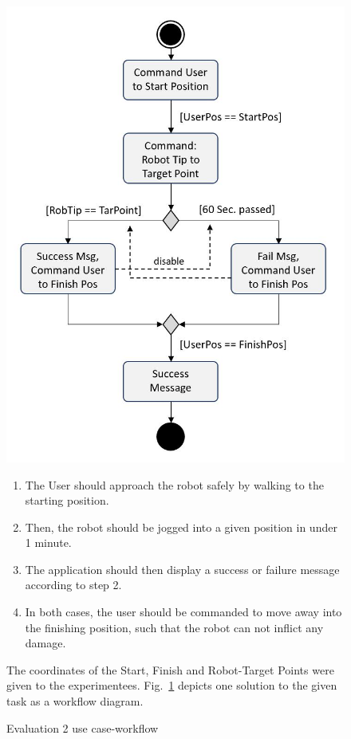 \begin{figure}[!h]
	\begin{minipage}{0.4\textwidth}
		\centering
		\includegraphics[width=1\linewidth]{Figures/Evaluation2_workflow}
		\caption[Evaluation 2 use case-workflow]{Evaluation 2 use case-workflow}
		\label{Fig:Evaluation2Workflow}
	\end{minipage}\hfill
	\begin{minipage}{0.55\textwidth}
		\begin{enumerate}
			\item The User should approach the robot safely by walking to the starting position.
			\item Then, the robot should be jogged into a given position in under 1 minute.
			\item The application should then display a success or failure message according to step 2.
			\item In both cases, the user should be commanded to move away into the finishing position, such that the robot can not inflict any damage.
		\end{enumerate} 
		The coordinates of the Start, Finish and Robot-Target Points were given to the experimentees. Fig.~\ref{Fig:Evaluation2Workflow} depicts one solution to the given task as a workflow diagram. 
	\end{minipage}
\end{figure}

